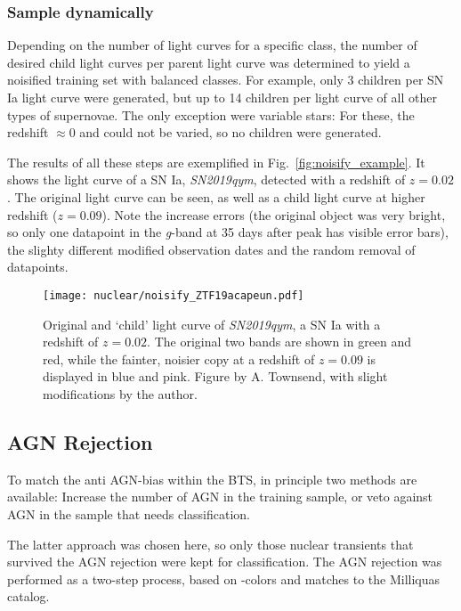 \subsubsection{Sample dynamically}
Depending on the number of light curves for a specific class, the number of desired child light curves per parent light curve was determined to yield a noisified training set with balanced classes. For example, only 3 children per SN Ia light curve were generated, but up to 14 children per light curve of all other types of supernovae. The only exception were variable stars: For these, the redshift $\approx 0$ and could not be varied, so no children were generated.

The results of all these steps are exemplified in Fig.~\ref{fig:noisify_example}. It shows the light curve of a SN Ia, \textit{SN2019qym}, detected with a redshift of $z=0.02$. The original light curve can be seen, as well as a child light curve at higher redshift ($z=0.09$). Note the increase errors (the original object was very bright, so only one datapoint in the \textit{g}-band at 35 days after peak has visible error bars), the slighty different modified observation dates and the random removal of datapoints.

\begin{figure}[H]
  \texttt{[image: nuclear/noisify\_ZTF19acapeun.pdf]}
  \caption[Augmentation example]{Original and `child' light curve of \textit{SN2019qym}, a SN Ia with a redshift of $z=0.02$. The original two bands are shown in green and red, while the fainter, noisier copy at a redshift of $z=0.09$ is displayed in blue and pink. Figure by A. Townsend, with slight modifications by the author.}
\end{figure}

\subsection{AGN Rejection}\label{agn_rejection}
To match the anti AGN-bias within the BTS, in principle two methods are available: Increase the number of AGN in the training sample, or veto against AGN in the sample that needs classification.

The latter approach was chosen here, so only those nuclear transients that survived the AGN rejection were kept for classification. The AGN rejection was performed as a two-step process, based on -colors and matches to the Milliquas catalog.

